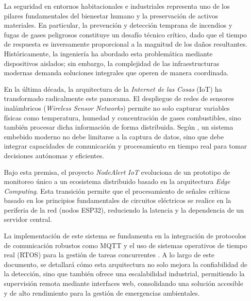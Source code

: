 La seguridad en entornos habitacionales e industriales representa uno de los pilares fundamentales del bienestar humano y la preservación de activos materiales. En particular, la prevención y detección temprana de incendios y fugas de gases peligrosos constituye un desafío técnico crítico, dado que el tiempo de respuesta es inversamente proporcional a la magnitud de los daños resultantes. Históricamente, la ingeniería ha abordado esta problemática mediante dispositivos aislados; sin embargo, la complejidad de las infraestructuras modernas demanda soluciones integrales que operen de manera coordinada.

En la última década, la arquitectura de la \textit{Internet de las Cosas} (IoT) ha transformado radicalmente este panorama. El despliegue de redes de sensores inalámbricos (\textit{Wireless Sensor Networks}) permite no solo capturar variables físicas como temperatura, humedad y concentración de gases combustibles, sino también procesar dicha información de forma distribuida. Según \citet{valvano2014volume1}, un sistema embebido moderno no debe limitarse a la captura de datos, sino que debe integrar capacidades de comunicación y procesamiento en tiempo real para tomar decisiones autónomas y eficientes.

Bajo esta premisa, el proyecto \textit{NodeAlert IoT } evoluciona de un prototipo de monitoreo único a un ecosistema distribuido basado en la arquitectura \textit{Edge Computing}. Esta transición permite que el procesamiento de señales críticas basado en los principios fundamentales de circuitos eléctricos \citep{alexander2006}  se realice en la periferia de la red (nodos ESP32), reduciendo la latencia y la dependencia de un servidor central. 

La implementación de este sistema se fundamenta en la integración de protocolos de comunicación robustos como MQTT y el uso de sistemas operativos de tiempo real (RTOS) para la gestión de tareas concurrentes . A lo largo de este documento, se detallará cómo esta arquitectura no solo mejora la confiabilidad de la detección, sino que también ofrece una escalabilidad industrial, permitiendo la supervisión remota mediante interfaces web, consolidando una solución accesible y de alto rendimiento para la gestión de emergencias ambientales.